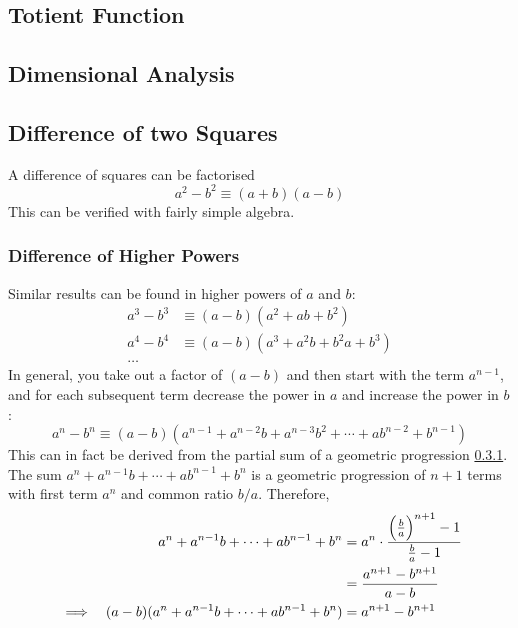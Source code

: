 \documentclass[fleqn,a4paper,11pt]{article}
\begin{document}
    \subsection{Totient Function} \label{sec_totient}

    \subsection{Dimensional Analysis}

    \subsection{Difference of two Squares}

    A difference of squares can be factorised
    \begin{equation}
    a^2 - b^2 \equiv (a + b)(a - b)
    \end{equation}
    This can be verified with fairly simple
    algebra.

    \subsubsection{Difference of Higher Powers}

    Similar results can be found in higher powers of \(a\) and \(b\):
    \begin{align*}
    a^3 - b^3 &\equiv (a - b)(a^2 + ab + b^2) \\
    a^4 - b^4 &\equiv (a - b)(a^3 + a^2b + b^2a + b^3) \\
    \dots
    \end{align*}
    In general, you take out a factor of \((a - b)\) and then start with the
    term \(a^{n - 1}\), and for each subsequent term decrease the power in \(a\)
    and increase the power in \(b\):
    \begin{equation}
    a^n - b^n \equiv (a - b)(a^{n - 1} + a^{n - 2}b + a^{n - 3}b^2 + \dotsb +
                             ab^{n - 2} + b^{n - 1})
    \end{equation}
    This can in fact be derived from the partial sum of a geometric progression
    \ref{}. The sum \(a^n + a^{n - 1}b + \dotsb + ab^{n - 1} + b^n\) is
    a geometric progression of \(n + 1\) terms with first term \(a^n\) and
    common ratio \(b/a\).  Therefore,
    \begin{alignat*}{2}
    &&a^n + a^{n - 1}b + \dotsb + ab^{n - 1} + b^n &=
            a^n \cdot \frac{\pqty{\frac ba}^{n + 1} - 1}{\frac ba - 1} \\
    &&    &= \frac{a^{n + 1} - b^{n + 1}}{a - b} \\
    &\implies& (a - b)(a^n + a^{n - 1}b + \dotsb + ab^{n - 1} + b^n) &=
            a^{n + 1} - b^{n + 1}
    \end{alignat*}
\end{document}
